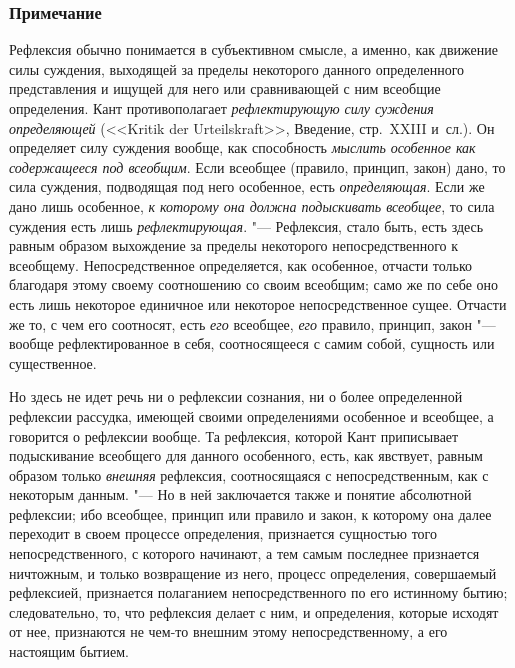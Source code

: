 \subsubsection[Примечание]{Примечание}

Рефлексия обычно понимается в субъективном смысле, а именно, как движение
силы суждения, выходящей за пределы некоторого данного определенного
представления и ищущей для него или сравнивающей с ним всеобщие
определения. Кант противополагает {\em рефлектирующую
силу суждения определяющей} (<<Kritik der Urteilskraft>>, Введение,
стр.~XXIII и~сл.).
Он определяет силу суждения вообще, как способность
{\em мыслить особенное как содержащееся под всеобщим}.
Если всеобщее (правило, принцип, закон) дано, то сила суждения, подводящая
под него особенное, есть {\em определяющая}. Если же
дано лишь особенное, {\em к которому она должна
подыскивать всеобщее}, то сила суждения есть лишь
{\em рефлектирующая}.
"--- Рефлексия, стало быть, есть здесь равным образом выхождение за пределы
некоторого непосредственного к всеобщему. Непосредственное определяется,
как особенное, отчасти только благодаря этому своему соотношению со своим
всеобщим; само же по себе оно есть лишь некоторое единичное или некоторое
непосредственное сущее. Отчасти же то, с чем его соотносят, есть
{\em его} всеобщее, {\em его}
правило, принцип, закон "--- вообще рефлектированное в себя, соотносящееся с
самим собой, сущность или существенное.

Но здесь не идет речь ни о рефлексии сознания, ни о более определенной
рефлексии рассудка, имеющей своими определениями особенное и всеобщее, а
говорится о рефлексии вообще. Та рефлексия, которой Кант приписывает
подыскивание всеобщего для данного особенного, есть, как явствует, равным
образом только {\em внешняя} рефлексия, соотносящаяся с
непосредственным, как с некоторым данным. "--- Но в ней заключается также и
понятие абсолютной рефлексии; ибо всеобщее, принцип или правило и закон, к
которому она далее переходит в своем процессе определения, признается
сущностью того непосредственного, с которого начинают, а тем самым
последнее признается ничтожным, и только возвращение из него, процесс
определения, совершаемый рефлексией, признается полаганием
непосредственного по его истинному бытию; следовательно, то, что рефлексия
делает с ним, и определения, которые исходят от нее, признаются не чем-то
внешним этому непосредственному, а его настоящим бытием.

